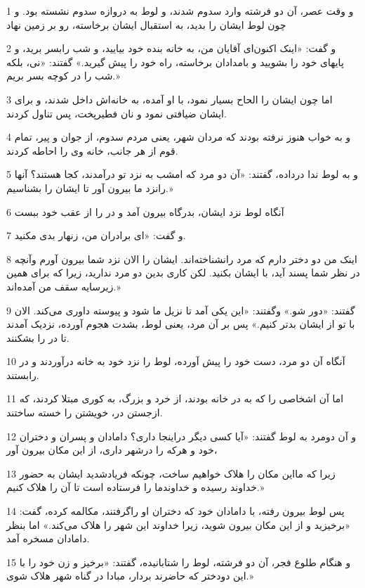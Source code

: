 \par 1 و وقت عصر، آن دو فرشته وارد سدوم شدند، و لوط به دروازه سدوم نشسته بود. و چون لوط ایشان را بدید، به استقبال ایشان برخاسته، رو بر زمین نهاد
\par 2 و گفت: «اینک اکنون‌ای آقایان من، به خانه بنده خود بیایید، و شب رابسر برید، و پایهای خود را بشویید و بامدادان برخاسته، راه خود را پیش گیرید.» گفتند: «نی، بلکه شب را در کوچه بسر بریم.»
\par 3 اما چون ایشان را الحاح بسیار نمود، با او آمده، به خانه‌اش داخل شدند، و برای ایشان ضیافتی نمود و نان فطیرپخت، پس تناول کردند.
\par 4 و به خواب هنوز نرفته بودند که مردان شهر، یعنی مردم سدوم، از جوان و پیر، تمام قوم از هر جانب، خانه وی را احاطه کردند.
\par 5 و به لوط ندا در‌داده، گفتند: «آن دو مرد که امشب به نزد تو درآمدند، کجا هستند؟ آنها رانزد ما بیرون آور تا ایشان را بشناسیم.»
\par 6 آنگاه لوط نزد ایشان، بدرگاه بیرون آمد و در را از عقب خود ببست
\par 7 و گفت: «ای برادران من، زنهار بدی مکنید.
\par 8 اینک من دو دختر دارم که مرد رانشناخته‌اند. ایشان را الان نزد شما بیرون آورم وآنچه در نظر شما پسند آید، با ایشان بکنید. لکن کاری بدین دو مرد ندارید، زیرا که برای همین زیرسایه سقف من آمده‌اند.»
\par 9 گفتند: «دور شو.» وگفتند: «این یکی آمد تا نزیل ما شود و پیوسته داوری می‌کند. الان با تو از ایشان بدتر کنیم.» پس بر آن مرد، یعنی لوط، بشدت هجوم آورده، نزدیک آمدند تا در را بشکنند.
\par 10 آنگاه آن دو مرد، دست خود را پیش آورده، لوط را نزد خود به خانه درآوردند و در رابستند.
\par 11 اما آن اشخاصی را که به در خانه بودند، از خرد و بزرگ، به کوری مبتلا کردند، که ازجستن در، خویشتن را خسته ساختند.
\par 12 و آن دومرد به لوط گفتند: «آیا کسی دیگر دراینجا داری؟ دامادان و پسران و دختران خود و هر‌که را درشهر داری، از این مکان بیرون آور،
\par 13 زیرا که مااین مکان را هلاک خواهیم ساخت، چونکه فریادشدید ایشان به حضور خداوند رسیده و خداوندما را فرستاده است تا آن را هلاک کنیم.»
\par 14 پس لوط بیرون رفته، با دامادان خود که دختران او راگرفتند، مکالمه کرده، گفت: «برخیزید و از این مکان بیرون شوید، زیرا خداوند این شهر را هلاک می‌کند.» اما بنظر دامادان مسخره آمد.
\par 15 و هنگام طلوع فجر، آن دو فرشته، لوط را شتابانیده، گفتند: «برخیز و زن خود را با این دودختر که حاضرند بردار، مبادا در گناه شهر هلاک شوی.»
